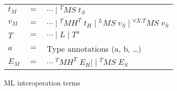 \begin{figure}
\begin{center}
\begin{tabular}{lcl}
$t_{M}$ & $=$ & $\cdots\;\vert\;^{T}MS\;t_{S}$ \\
$v_{M}$ & $=$ & $\cdots\;\vert\;^{T}MH^{T}\;t_{H}\;\vert\;^{L}MS\;v_{S}\;\vert\;^{\forall X.T}MS\;v_{S}$ \\
$T$ & $=$ & $\cdots\;\vert\;L\;\vert\;T^{a}$ \\
$a$ & $=$ & Type annotations (a, b, \ldots) \\
$E_{M}$ & $=$ & $\cdots\;^{T}MH^{T}\;E_{H}\vert\;\vert\;^{T}MS\;E_{S}$
\end{tabular}
\end{center}
\caption{ML interoperation terms}
\label{fig:mit}
\end{figure}